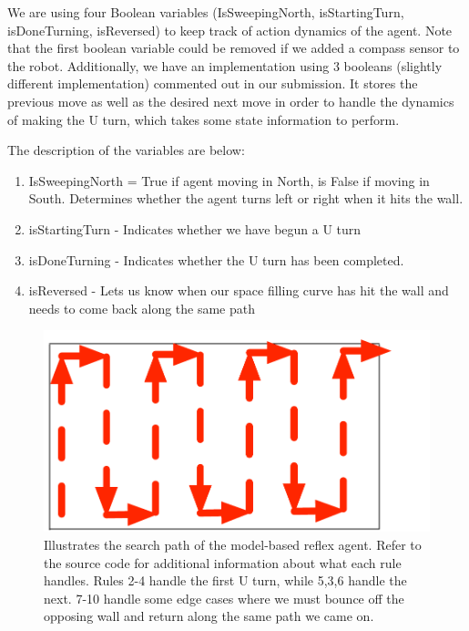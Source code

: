 \documentclass{article}
\begin{document}
We are using  four Boolean variables (IsSweepingNorth, isStartingTurn, isDoneTurning, isReversed) to keep track of action dynamics of the agent. Note that the first boolean variable could be removed if we added a compass sensor to the robot.  Additionally, we have an implementation using 3 booleans (slightly different implementation) commented out in our submission.  It stores the previous move as well as the desired next move in order to handle the dynamics of making the U turn, which takes some state information to perform.

The description of the variables are below: 
\begin{enumerate}
\item IsSweepingNorth = True if agent moving in North, is False if moving in South. Determines whether the agent turns left or right when it hits the wall.
\item isStartingTurn - Indicates whether we have begun a U turn
\item isDoneTurning - Indicates whether the U turn has been completed.
\item isReversed - Lets us know when our space filling curve has hit the wall and needs to come back along the same path 
\end{enumerate}

\begin{figure}[h!]
\centering
\includegraphics[width=1\linewidth]{snaking}
\caption{Illustrates the search path of the model-based reflex agent.  Refer to the source code for additional information about what each rule handles.  Rules 2-4 handle the first U turn, while 5,3,6 handle the next.  7-10 handle some edge cases where we must bounce off the opposing wall and return along the same path we came on.}
\label{fig:reflex}
\end{figure}
\clearpage
\end{document}
